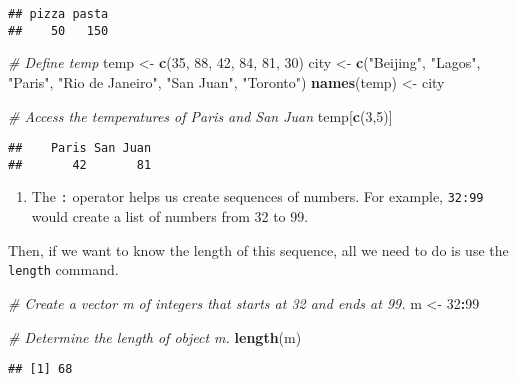 \documentclass[]{article}
\newenvironment{Shaded}{\begin{snugshade}}{\end{snugshade}}
\newcommand{\CommentTok}[1]{\textcolor[rgb]{0.56,0.35,0.01}{\textit{#1}}}
\newcommand{\DecValTok}[1]{\textcolor[rgb]{0.00,0.00,0.81}{#1}}
\newcommand{\KeywordTok}[1]{\textcolor[rgb]{0.13,0.29,0.53}{\textbf{#1}}}
\newcommand{\NormalTok}[1]{#1}
\newcommand{\OperatorTok}[1]{\textcolor[rgb]{0.81,0.36,0.00}{\textbf{#1}}}
\newcommand{\StringTok}[1]{\textcolor[rgb]{0.31,0.60,0.02}{#1}}
\providecommand{\tightlist}{%
  \setlength{\itemsep}{0pt}\setlength{\parskip}{0pt}}
\begin{document}
\begin{verbatim}
## pizza pasta 
##    50   150
\end{verbatim}

\begin{Shaded}
\begin{Highlighting}[]
\CommentTok{# Define temp}
\NormalTok{temp <-}\StringTok{ }\KeywordTok{c}\NormalTok{(}\DecValTok{35}\NormalTok{, }\DecValTok{88}\NormalTok{, }\DecValTok{42}\NormalTok{, }\DecValTok{84}\NormalTok{, }\DecValTok{81}\NormalTok{, }\DecValTok{30}\NormalTok{)}
\NormalTok{city <-}\StringTok{ }\KeywordTok{c}\NormalTok{(}\StringTok{"Beijing"}\NormalTok{, }\StringTok{"Lagos"}\NormalTok{, }\StringTok{"Paris"}\NormalTok{, }\StringTok{"Rio de Janeiro"}\NormalTok{, }\StringTok{"San Juan"}\NormalTok{, }\StringTok{"Toronto"}\NormalTok{)}
\KeywordTok{names}\NormalTok{(temp) <-}\StringTok{ }\NormalTok{city}

\CommentTok{# Access the temperatures of Paris and San Juan}
\NormalTok{temp[}\KeywordTok{c}\NormalTok{(}\DecValTok{3}\NormalTok{,}\DecValTok{5}\NormalTok{)]}
\end{Highlighting}
\end{Shaded}

\begin{verbatim}
##    Paris San Juan 
##       42       81
\end{verbatim}

\begin{enumerate}
\def\labelenumi{\arabic{enumi}.}
\setcounter{enumi}{5}
\tightlist
\item
  The \texttt{:} operator helps us create sequences of numbers. For
  example, \texttt{32:99} would create a list of numbers from 32 to 99.
\end{enumerate}

Then, if we want to know the length of this sequence, all we need to do
is use the \texttt{length} command.

\begin{Shaded}
\begin{Highlighting}[]
\CommentTok{# Create a vector m of integers that starts at 32 and ends at 99.}
\NormalTok{m <-}\StringTok{ }\DecValTok{32}\OperatorTok{:}\DecValTok{99}

\CommentTok{# Determine the length of object m.}
\KeywordTok{length}\NormalTok{(m)}
\end{Highlighting}
\end{Shaded}

\begin{verbatim}
## [1] 68
\end{verbatim}
\end{document}
